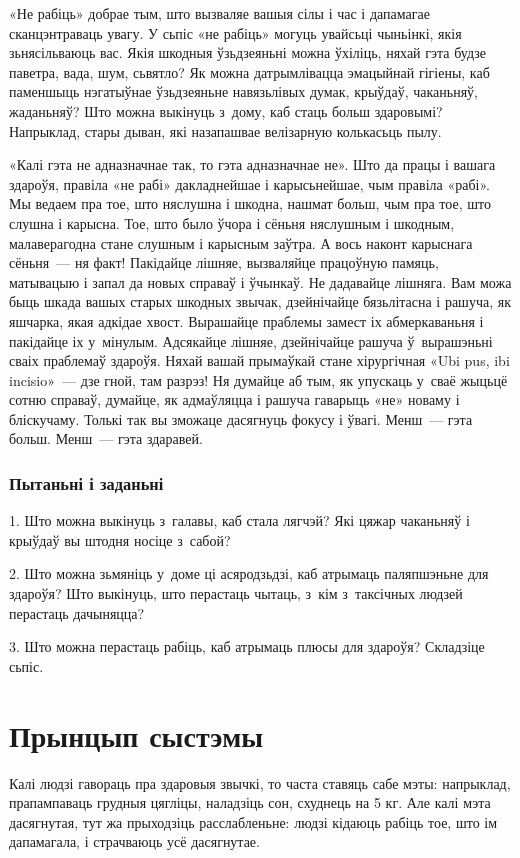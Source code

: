 «Не рабіць» добрае тым, што вызваляе вашыя сілы і час і дапамагае сканцэнтраваць увагу. У сьпіс «не рабіць» могуць увайсьці чыньінкі, якія зьнясільваюць вас. Якія шкодныя ўзьдзеяньні можна ўхіліць, няхай гэта будзе паветра, вада, шум, сьвятло? Як можна датрымлівацца эмацыйнай гігіены, каб паменшыць нэгатыўнае ўзьдзеяньне навязьлівых думак, крыўдаў, чаканьняў, жаданьняў? Што можна выкінуць з~дому, каб стаць больш здаровымі? Напрыклад, стары дыван, які назапашвае велізарную колькасьць пылу.

«Калі гэта не адназначнае так, то гэта адназначнае не». Што да працы і вашага здароўя, правіла «не рабі» дакладнейшае і карысьнейшае, чым правіла «рабі». Мы ведаем пра тое, што няслушна і шкодна, нашмат больш, чым пра тое, што слушна і карысна. Тое, што было ўчора і сёньня няслушным і шкодным, малаверагодна стане слушным і карысным заўтра. А вось наконт карыснага сёньня~--- ня факт! Пакідайце лішняе, вызваляйце працоўную памяць, матывацыю і запал да новых справаў і ўчынкаў. Не дадавайце лішняга. Вам можа быць шкада вашых старых шкодных звычак, дзейнічайце бязьлітасна і рашуча, як яшчарка, якая адкідае хвост. Вырашайце праблемы замест іх абмеркаваньня і пакідайце іх у~мінулым. Адсякайце лішняе, дзейнічайце рашуча ў~вырашэньні сваіх праблемаў здароўя. Няхай вашай прымаўкай стане хірургічная «Ubi pus, ibi incisio»~--- дзе гной, там разрэз! Ня думайце аб тым, як упускаць у~сваё жыцьцё сотню справаў, думайце, як адмаўляцца і рашуча гаварыць «не» новаму і бліскучаму. Толькі так вы зможаце дасягнуць фокусу і ўвагі. Менш~--- гэта больш. Менш~--- гэта здаравей.

\subsubsection{Пытаньні і заданьні}

1. Што можна выкінуць з~галавы, каб стала лягчэй? Які цяжар чаканьняў і крыўдаў вы штодня носіце з~сабой?

2. Што можна зьмяніць у~доме ці асяродзьдзі, каб атрымаць паляпшэньне для здароўя? Што выкінуць, што перастаць чытаць, з~кім з~таксічных людзей перастаць дачыняцца?

3. Што можна перастаць рабіць, каб атрымаць плюсы для здароўя? Складзіце сьпіс.


\section{Прынцып сыстэмы}

Калі людзі гавораць пра здаровыя звычкі, то часта ставяць сабе мэты: напрыклад, прапампаваць грудныя цягліцы, наладзіць сон, схуднець на 5 кг. Але калі мэта дасягнутая, тут жа прыходзіць расслабленьне: людзі кідаюць рабіць тое, што ім дапамагала, і страчваюць усё дасягнутае.

